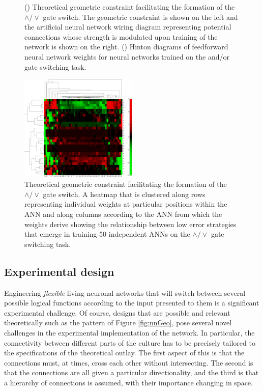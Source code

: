 \begin{figure}
\begin{center}
\begin{subfigure}[b]{0.45\linewidth}
\begin{center}
\begin{tabular}{cccc}
\end{tabular}
\end{center}
\caption{}\label{fig:hintDiag}
\end{subfigure}
\end{center}
\caption{() Theoretical geometric constraint facilitating the formation of the $\wedge / \vee$ gate switch. The geometric constraint is shown on the left and the artificial neural network wiring diagram representing potential connections whose strength is modulated upon training of the network is shown on the right. () Hinton diagrams of feedforward neural network weights for neural networks trained on the and/or gate switching task.}\label{fig:neuralnets}
\end{figure}

\begin{figure}
\begin{center}
\includegraphics[width=0.5\textwidth]{../fig/dendrogram.pdf}
\end{center}
\caption{Theoretical geometric constraint facilitating the formation of the $\wedge / \vee$ gate switch. A heatmap that is clustered along rows representing individual weights at particular positions within the ANN and along columns according to the ANN from which the weights derive showing the relationship between low error strategies that emerge in training 50 independent ANNs on the $\wedge / \vee$ gate switching task.}\label{fig:nnDendro}
\end{figure}

\subsection{Experimental design}
Engineering {\it flexible} living neuronal networks that will switch between several possible logical functions according to the input presented to them is a significant experimental challenge. Of course, designs that are possible and relevant theoretically such as the pattern of Figure \ref{fig:nnGeo}, pose several novel challenges in the experimental implementation of the network. In particular, the connectivity between different parts of the culture has to be precisely tailored to the specifications of the theoretical outlay. The first aspect of this is that the connections must, at times, cross each other without intersecting. The second is that the connections are all given a particular directionality, and the third is that a hierarchy of connections is assumed, with their importance changing in space.

